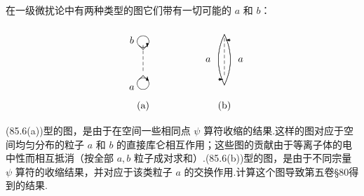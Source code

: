 在一级微扰论中有两种类型的图它们带有一切可能的 $a$ 和 $b$：
\begin{equation}
  \setlength{\unitlength}{0.72pt}%
  \begin{picture}(230,128)(0,0)
    \put(60,102){\tearDown}%
    \put(66,100){\vector(0,-1){6}}%
    \put(44,104){\makebox(0,0){$b$}}%
    \vdashx{60}{92}{-8}{5}%
    \put(60,42){\tearUp}%
    \put(66,46){\vector(0,1){6}}%
    \put(44,36){\makebox(0,0){$a$}}%
    \put(60,10){\makebox(0,0){(a)}}%
    \qbezier(175,112)(158,76)(175,40)%
    \qbezier(175,112)(192,76)(175,40)%
    \vdashx{175}{102}{-8}{7}%
    \put(184,104){\vector(-1,0){7}}%
    \put(166,48){\vector(1,0){7}}%
    \put(152,76){\makebox(0,0){$a$}}%
    \put(198,76){\makebox(0,0){$a$}}%
    \put(175,10){\makebox(0,0){(b)}}%
  \end{picture}
\end{equation}
(85.6(a))型的图，是由于在空间一些相同点 $\psi$ 算符收缩的结果.这样的图对应于空间均匀分布的粒子 $a$ 和 $b$ 的直接库仑相互作用；这些图的贡献由于等离子体的电中性而相互抵消（按全部 $a,b$ 粒子成对求和）.(85.6(b))型的图，是由于不同宗量 $\psi$ 算符的收缩结果，并对应于该类粒子 $a$ 的交换作用.计算这个图导致第五卷§80得到的结果.

